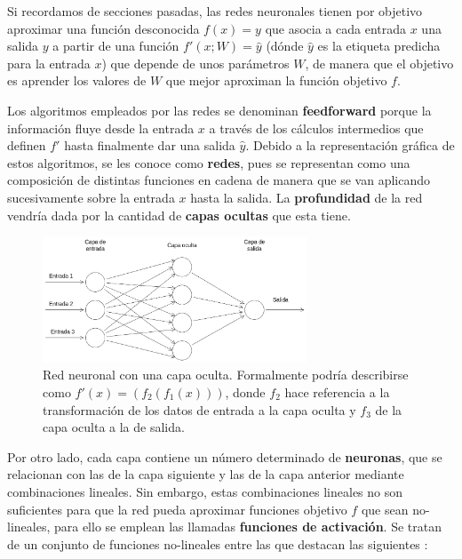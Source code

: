             \medskip

            \noindent Si recordamos de secciones pasadas, las redes neuronales tienen por objetivo aproximar una función desconocida $f(x)=y$ que asocia a cada entrada $x$ una salida $y$ a partir de una función $f'(x;W)= \widehat{y}$ (dónde $\widehat{y}$ es la etiqueta predicha para la entrada $x$) que depende de unos parámetros $W$, de manera que el objetivo es aprender los valores de $W$ que mejor aproximan la función objetivo $f$.

            \medskip

            \noindent Los algoritmos empleados por las redes se denominan \textbf{feedforward} porque la información fluye desde la entrada $x$ a través de los cálculos intermedios que definen $f'$ hasta finalmente dar una salida $\widehat{y}$. Debido a la representación gráfica de estos algoritmos, se les conoce como \textbf{redes}, pues se representan como una composición de distintas funciones en cadena de manera que se van aplicando sucesivamente sobre la entrada $x$ hasta la salida. La \textbf{profundidad} de la red vendría dada por la cantidad de \textbf{capas ocultas} que esta tiene.

            \begin{figure}[!h]
                \centering
                \includegraphics[width=0.7\textwidth]{img/single_hidden_layer.png}
                \caption{Red neuronal con una capa oculta. Formalmente podría describirse como $f'(x)=(f_2(f_1(x)))$, donde $f_2$ hace referencia a la transformación de los datos de entrada a la capa oculta y $f_3$ de la capa oculta a la de salida.}
                \label{fig:red_neuronal_capa_oculta}
            \end{figure}
            \medskip

            \noindent Por otro lado, cada capa contiene un número determinado de \textbf{neuronas}, que se relacionan con las de la capa siguiente y las de la capa anterior mediante combinaciones lineales. Sin embargo, estas combinaciones lineales no son suficientes para que la red pueda aproximar funciones objetivo $f$ que sean no-lineales, para ello se emplean las llamadas \textbf{funciones de activación}. Se tratan de un conjunto de funciones no-lineales entre las que destacan las siguientes \cite{sharma2017activation}: 

